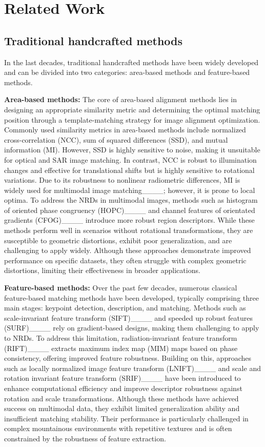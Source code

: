 \section{Related Work}
\label{2}
\subsection{Traditional handcrafted methods}
In the last decades, traditional handcrafted methods have been widely developed and can be divided into two categories: area-based methods and feature-based methods.

{\bf{Area-based methods:}} The core of area-based alignment methods lies in designing an appropriate similarity metric and determining the optimal matching position through a template-matching strategy for image alignment optimization. Commonly used similarity metrics in area-based methods include normalized cross-correlation (NCC), sum of squared differences (SSD), and mutual information (MI). However, SSD is highly sensitive to noise, making it unsuitable for optical and SAR image matching. In contrast, NCC is robust to illumination changes and effective for translational shifts but is highly sensitive to rotational variations. Due to its robustness to nonlinear radiometric differences, MI is widely used for multimodal image matching____; however, it is prone to local optima. To address the NRDs in multimodal images, methods such as histogram of oriented phase congruency (HOPC)____ and channel features of orientated gradients (CFOG)____ introduce more robust region descriptors. While these methods perform well in scenarios without rotational transformations, they are susceptible to geometric distortions, exhibit poor generalization, and are challenging to apply widely. Although these approaches demonstrate improved performance on specific datasets, they often struggle with complex geometric distortions, limiting their effectiveness in broader applications.


{\bf{Feature-based methods:}} 
Over the past few decades, numerous classical feature-based matching methods have been developed, typically comprising three main stages: keypoint detection, description, and matching. Methods such as scale-invariant feature transform (SIFT)____ and speeded up robust features (SURF)____ rely on gradient-based designs, making them challenging to apply to NRDs. To address this limitation, radiation-invariant feature transform (RIFT)____ extracts maximum index map (MIM) maps based on phase consistency, offering improved feature robustness. Building on this, approaches such as locally normalized image feature transform (LNIFT)____ and scale and rotation invariant feature transform (SRIF)____ have been introduced to enhance computational efficiency and improve descriptor robustness against rotation and scale transformations. Although these methods have achieved success on multimodal data, they exhibit limited generalization ability and insufficient matching stability. Their performance is particularly challenged in complex mountainous environments with repetitive textures and is often constrained by the robustness of feature extraction.


